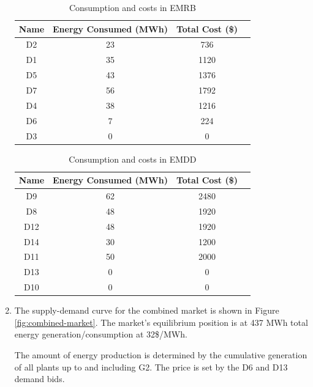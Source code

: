 \documentclass{homework}
\begin{document}
\begin{enumerate}
\begin{table}
    \centering
    \begin{tabular}{|c|c|c|c|}
        \hline
        Name & Energy Consumed (MWh) & Total Cost (\$)  \\
        \hline
            D2   &   23 &         736 \\
            D1   &   35 &        1120 \\
            D5   &   43 &        1376 \\
            D7   &   56 &        1792 \\
            D4   &   38 &        1216 \\
            D6   &    7 &         224 \\
            D3   &    0 &           0 \\
        \hline
    \end{tabular}
    \caption{Consumption and costs in EMRB}
    \label{tab:EMRB-costs}
\end{table}

\begin{table}
    \centering
    \begin{tabular}{|c|c|c|c|}
        \hline
        Name & Energy Consumed (MWh) & Total Cost (\$)  \\
        \hline
        D9    &  62  &       2480 \\
        D8    &  48  &       1920 \\
        D12   &  48  &       1920 \\
        D14   &  30  &       1200 \\
        D11   &  50  &       2000 \\
        D13   &   0  &          0 \\
        D10   &   0  &          0 \\
        \hline
    \end{tabular}
    \caption{Consumption and costs in EMDD}
    \label{tab:EMDD-costs}
\end{table}


\item The supply-demand curve for the combined market is shown in Figure
\ref{fig:combined-market}. The market's equilibrium position
is at 437 MWh total energy generation/consumption at 32\$/MWh.

The amount of energy production is determined by the cumulative generation 
of all plants up to and including G2. The price is set
by the D6 and D13 demand bids.


\end{enumerate}
\end{document}
